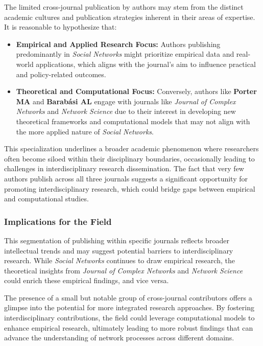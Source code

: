 \documentclass[twocolumn]{article}
\begin{document}
	The limited cross-journal publication by authors may stem from the distinct academic cultures and publication strategies inherent in their areas of expertise. It is reasonable to hypothesize that:
	\begin{itemize}
		\item \textbf{Empirical and Applied Research Focus:} Authors publishing predominantly in \textit{Social Networks} might prioritize empirical data and real-world applications, which aligns with the journal's aim to influence practical and policy-related outcomes.
		\item \textbf{Theoretical and Computational Focus:} Conversely, authors like \textbf{Porter MA} and \textbf{Barabási AL} engage with journals like \textit{Journal of Complex Networks} and \textit{Network Science} due to their interest in developing new theoretical frameworks and computational models that may not align with the more applied nature of \textit{Social Networks}.
	\end{itemize}
	
	This specialization underlines a broader academic phenomenon where researchers often become siloed within their disciplinary boundaries, occasionally leading to challenges in interdisciplinary research dissemination. The fact that very few authors publish across all three journals suggests a significant opportunity for promoting interdisciplinary research, which could bridge gaps between empirical and computational studies.
	
	\subsubsection*{Implications for the Field}
	
	This segmentation of publishing within specific journals reflects broader intellectual trends and may suggest potential barriers to interdisciplinary research. While \textit{Social Networks} continues to draw empirical research, the theoretical insights from \textit{Journal of Complex Networks} and \textit{Network Science} could enrich these empirical findings, and vice versa.
	
	The presence of a small but notable group of cross-journal contributors offers a glimpse into the potential for more integrated research approaches. By fostering interdisciplinary contributions, the field could leverage computational models to enhance empirical research, ultimately leading to more robust findings that can advance the understanding of network processes across different domains.
	
\end{document}
